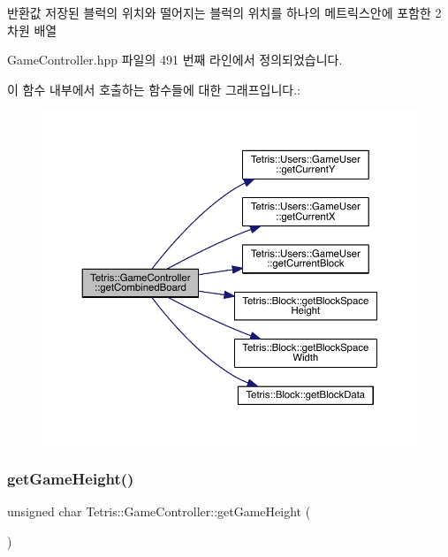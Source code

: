 \begin{DoxyReturn}{반환값}
저장된 블럭의 위치와 떨어지는 블럭의 위치를 하나의 메트릭스안에 포함한 2차원 배열 
\end{DoxyReturn}


Game\+Controller.\+hpp 파일의 491 번째 라인에서 정의되었습니다.

이 함수 내부에서 호출하는 함수들에 대한 그래프입니다.\+:
\nopagebreak
\begin{figure}[H]
\begin{center}
\leavevmode
\includegraphics[width=350pt]{class_tetris_1_1_game_controller_a6c22f25017881f6150428b62e4607310_cgraph}
\end{center}
\end{figure}
\mbox{\label{class_tetris_1_1_game_controller_a10163479e02572450b886ff0654078b4}} 
\subsubsection{\texorpdfstring{get\+Game\+Height()}{getGameHeight()}\hspace{0.1cm}{\footnotesize\ttfamily [1/2]}}
{\footnotesize\ttfamily unsigned char Tetris\+::\+Game\+Controller\+::get\+Game\+Height (\begin{DoxyParamCaption}{ }\end{DoxyParamCaption})\hspace{0.3cm}{\ttfamily [inline]}}



